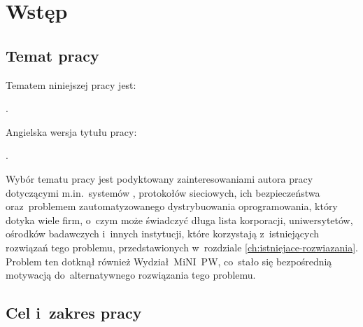 \documentclass[thesis]{subfiles}
\makeatletter
\let\inserttitle\@title
\let\inserttitleaux\@titleaux
\makeatother
\begin{document}
\chapter{Wstęp}


\section{Temat pracy}

\noindent Tematem niniejszej pracy jest:
\begin{displayquote}
\inserttitle.
\end{displayquote}
Angielska wersja tytułu pracy:
\begin{displayquote}
\inserttitleaux.
\end{displayquote}
Wybór tematu pracy jest podyktowany zainteresowaniami autora pracy dotyczącymi m.in.~systemów , protokołów sieciowych, ich bezpieczeństwa oraz~problemem zautomatyzowanego dystrybuowania oprogramowania, który dotyka wiele firm, o~czym może świadczyć długa lista korporacji, uniwersytetów, ośrodków badawczych i~innych instytucji, które korzystają z~istniejących rozwiązań tego problemu, przedstawionych w~rozdziale \ref{ch:istniejace-rozwiazania}. Problem ten dotknął również Wydział~MiNI~PW, co~stało się bezpośrednią motywacją do~alternatywnego rozwiązania tego problemu.


\section{Cel i~zakres pracy}
\label{sec:cel-i-zakres}
\end{document}
